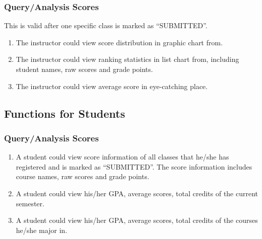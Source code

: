 \documentclass[a4]{article}
\begin{document}
\subsubsection{Query/Analysis Scores}
This is valid after one specific class is marked as ``SUBMITTED''.
\begin{enumerate}
\item The instructor could view score distribution in graphic chart from.
\item The instructor could view ranking statistics in list chart from, including student names, raw scores and grade points.
\item The instructor could view average score in eye-catching place.
\end{enumerate}
\subsection{Functions for Students}
\subsubsection{Query/Analysis Scores}

\begin{enumerate}
\item A student could view score information of all classes that he/she has registered and is marked as ``SUBMITTED''. The score information includes course names, raw scores and grade points.
\item A student could view his/her GPA, average scores, total credits of the current semester.
\item A student could view his/her GPA, average scores, total credits of the courses he/she major in. 

\end{enumerate}
\end{document}
